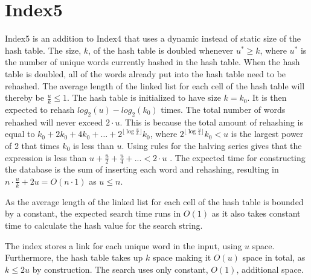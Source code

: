 \section{Index5}
\label{section:Index5}

Index5 is an addition to Index4 that uses a dynamic instead of static size of the hash table. The size, $k$, of the hash table is doubled whenever $u^*\geq k$, where $u^*$ is the number of unique words currently hashed in the hash table. When the hash table is doubled, all of the words already put into the hash table need to be rehashed. The average length of the linked list for each cell of the hash table will thereby be $\frac{u}{k} \leq 1$. The hash table is initialized to have size $k=k_0$. It is then expected to rehash $log_2(u)-log_2(k_0)$ times. The total number of words rehashed will never exceed $2\cdot u$. This is because the total amount of rehashing is equal to $k_0 + 2k_0 + 4k_0 + \dots + 2^{\lfloor\log\frac{u}{k}\rfloor}k_0$, where $2^{\lfloor\log\frac{u}{k}\rfloor}k_0 < u$ is the largest power of 2 that times $k_0$ is less than $u$. Using rules for the halving series gives that the expression is less than $u + \frac{u}{2} + \frac{u}{4} + ... < 2\cdot u$ . The expected time for constructing the database is the sum of inserting each word and rehashing, resulting in $n\cdot \frac{u}{k} + 2u = O(n\cdot 1)$ as $u\leq n$.

As the average length of the linked list for each cell of the hash table is bounded by a constant, the expected search time runs in $O(1)$ as it also takes constant time to calculate the hash value for the search string.

The index stores a link for each unique word in the input, using $u$ space. Furthermore, the hash table takes up $k$ space making it $O(u)$ space in total, as $k\leq 2u$ by construction. The search uses only constant, $O(1)$, additional space. 
